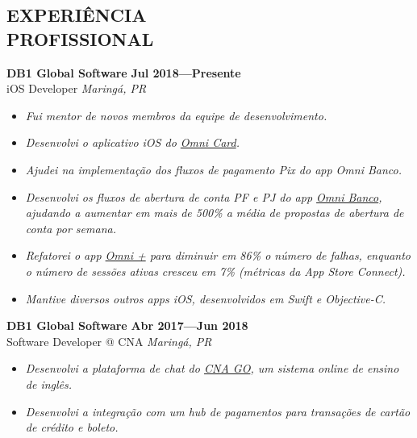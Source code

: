 \documentclass[line,margin]{res}
\begin{document}


\address{\sl \href{https://marcosatanaka.com}{marcosatanaka.com} --- \href{mailto:marcosatanaka@gmail.com}{marcosatanaka@gmail.com}}


\begin{resume}


\section{EXPERIÊNCIA \\ PROFISSIONAL}
  {\bf DB1 Global Software} \hfill {\bf Jul 2018---Presente} \\
  iOS Developer \hfill {\sl Maring\'a, PR}\\[-6pt]
  \begin{itemize}
    \item {\sl Fui mentor de novos membros da equipe de desenvolvimento.}
    \item {\sl Desenvolvi o aplicativo iOS do \href{https://apps.apple.com/us/app/id1490242421}{Omni Card}.}
    \item {\sl Ajudei na implementação dos fluxos de pagamento Pix do app Omni Banco.}
    \item {\sl Desenvolvi os fluxos de abertura de conta PF e PJ do app \href{https://apps.apple.com/br/app/omni-banco/id1369601365}{Omni Banco}, ajudando a aumentar em mais de 500\% a média de propostas de abertura de conta por semana.}
    \item {\sl Refatorei o app \href{https://apps.apple.com/br/app/omni/id1276332750}{Omni +} para diminuir em 86\% o número de falhas, enquanto o número de sessões ativas cresceu em 7\% (métricas da App Store Connect).}
    \item {\sl Mantive diversos outros apps iOS, desenvolvidos em Swift e Objective-C.}
  \end{itemize}

  {\bf DB1 Global Software} \hfill {\bf Abr 2017---Jun 2018} \\
  Software Developer @ CNA \hfill {\sl Maring\'a, PR}\\[-6pt]
  \begin{itemize}
    \item {\sl Desenvolvi a plataforma de chat do \href{https://www.cnago.com.br}{CNA GO}, um sistema online de ensino de inglês.}
    \item {\sl Desenvolvi a integração com um hub de pagamentos para transações de cartão de crédito e boleto.}
  \end{itemize}


\end{resume}
\end{document}

